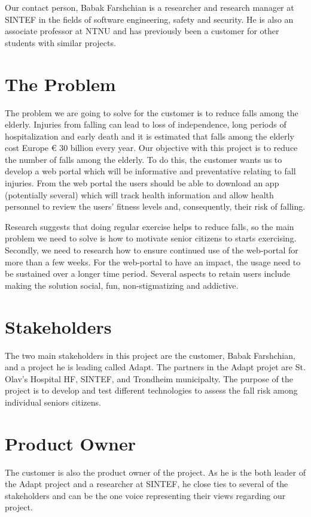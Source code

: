 Our contact person, Babak Farshchian is a researcher and research manager at SINTEF in the fields of software engineering, safety and security.  He is also an associate professor at NTNU and has previously been a customer for other students with similar projects.

\section{The Problem}

The problem we are going to solve for the customer is to reduce falls among the elderly. Injuries from falling can lead to loss of independence, long periods of hospitalization and early death and it is estimated that falls among the elderly cost Europe \euro{} 30 billion every year.  Our objective with this project is to reduce the number of falls among the elderly. To do this, the customer wants us to develop a web portal which will be informative and preventative relating to fall injuries. From the web portal the users should be able to download an app (potentially several) which will track health information and allow health personnel to review the users’ fitness levels and, consequently, their risk of falling.

Research suggests that doing regular exercise helps to reduce falls, so the main problem we need to solve is how to motivate senior citizens to starts exercising. Secondly, we need to research how to ensure continued use of the web-portal for more than a few weeks. For the web-portal to have an impact, the usage need to be sustained over a longer time period. Several aspects to retain users include making the solution social, fun, non-stigmatizing and addictive. 
\section{Stakeholders}
The two main stakeholders in this project are the customer, Babak Farshchian, and a project he is leading called Adapt. The partners in the Adapt projet are St. Olav's Hospital HF, SINTEF, and Trondheim municipalty. The purpose of the project is to develop and test different technologies to assess the fall risk among individual seniors citizens.\citep{adapt}

\section{Product Owner}
The customer is also the product owner of the project. As he is the both leader of the Adapt project and a researcher at SINTEF, he close ties to several of the stakeholders and can be the one voice representing their views regarding our project.

